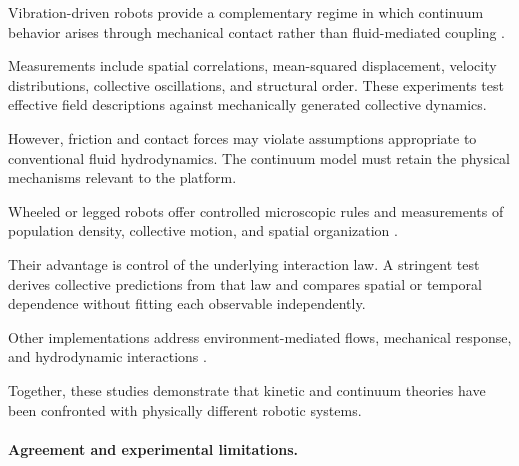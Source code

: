 Vibration-driven robots provide a complementary
regime in which continuum behavior arises
through mechanical contact rather than
fluid-mediated coupling
\cite{Scholz2018rotatingrobotsmove,Arbel2025amechanicalroutef,Baconnier2022selectiveandcollec,Casiulis2025ageometricconditio,Deblais2018boundariescontrolc,Boudet2022effectivetemperatur,Wang2025hyperuniformnetwork,Miyashita2007selfassembleofwat,Mayya2019nonuniformrobotde,Li2021programmingactivec,Zion2023morphologicalcomput,Wagner2026geometryinducedtra,Lvay2026collectivedynamics,Zion2021distributedonline}.

Measurements include spatial correlations,
mean-squared displacement, velocity distributions,
collective oscillations, and structural order.
These experiments test effective field descriptions
against mechanically generated collective dynamics.

However, friction and contact forces may violate
assumptions appropriate to conventional fluid
hydrodynamics. The continuum model must retain
the physical mechanisms relevant to the platform.

Wheeled or legged robots offer controlled
microscopic rules and measurements of population
density, collective motion, and spatial organization
\cite{Giardina2022collectivephototact,Fersula2026aggregatingswarmst,Valentini2015collectivedecision,Zhou2024anticipationpromote,Hamann2008spatialmacroscopic,Maffettone2024mixedrealityenviro,Aguilar2018collectiveclogcont,Kernbach2013adaptivecollective,Arvin2011imitationofhoneybe,Prasath2022dynamicsofcooperat,Fruchart2020phasetransitionsin}.

Their advantage is control of the underlying
interaction law. A stringent test derives
collective predictions from that law and
compares spatial or temporal dependence
without fitting each observable independently.

Other implementations address environment-mediated
flows, mechanical response, and hydrodynamic
interactions
\cite{Bo2026threephasesofodd,Newbolt2024flowinteractionsle,Boudet2025effectsofboundarie,Ren2025chlamydomonasinspir,Leech2026spincoupledhydrody,Heuthe2025tunablecolloidalsw,Guo2026afeedbackcontrolle,Luo2025flockingphasesepar,Savoie2019arobotmadeofrobo,Li2020programmingactiveg,Miyashita2008howmorphologyaffec,Fruchart2021nonreciprocalphase}.

Together, these studies demonstrate that kinetic
and continuum theories have been confronted with
physically different robotic systems.

\paragraph*{Agreement and experimental limitations.}

